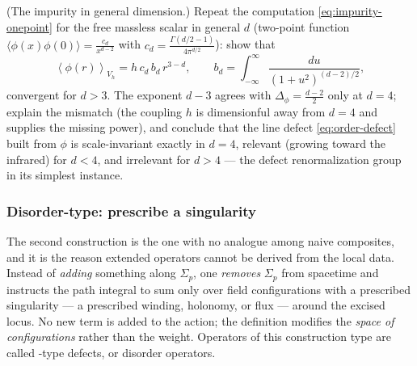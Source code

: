 \begin{exercise}[easy]
\label{exr:impurity-general-d}
(The impurity in general dimension.) Repeat the computation
\eqref{eq:impurity-onepoint} for the free massless scalar in general $d$
(two-point function $\langle\phi(x)\phi(0)\rangle = \frac{c_d}{x^{d-2}}$
with $c_d = \frac{\Gamma(d/2-1)}{4\pi^{d/2}}$): show that
\begin{equation*}
\left\langle \phi(r) \right\rangle_{V_h} = h\, c_d\, b_d\, r^{3-d},
\qquad
b_d = \int_{-\infty}^\infty \frac{du}{(1+u^2)^{(d-2)/2}},
\end{equation*}
convergent for $d > 3$. The exponent $d - 3$ agrees with $\Delta_\phi =
\frac{d-2}{2}$ only at $d = 4$; explain the mismatch (the coupling $h$
is dimensionful away from $d = 4$ and supplies the missing power), and
conclude that the line defect \eqref{eq:order-defect} built from $\phi$
is scale-invariant exactly in $d = 4$, relevant (growing toward the
infrared) for $d < 4$, and irrelevant for $d > 4$ --- the defect
renormalization group in its simplest instance.
\end{exercise}

\subsubsection{Disorder-type: prescribe a singularity}
\label{sec:disorder-type}

The second construction is the one with no analogue among naive
composites, and it is the reason extended operators cannot be derived from
the local data. Instead of \emph{adding} something along $\Sigma_p$, one
\emph{removes} $\Sigma_p$ from spacetime and instructs the path integral to
sum only over field configurations with a prescribed singularity --- a
prescribed winding, holonomy, or flux --- around the excised locus. No new
term is added to the action; the definition modifies the \emph{space of
configurations} rather than the weight. Operators of this construction
type are called -type defects, or disorder operators.

